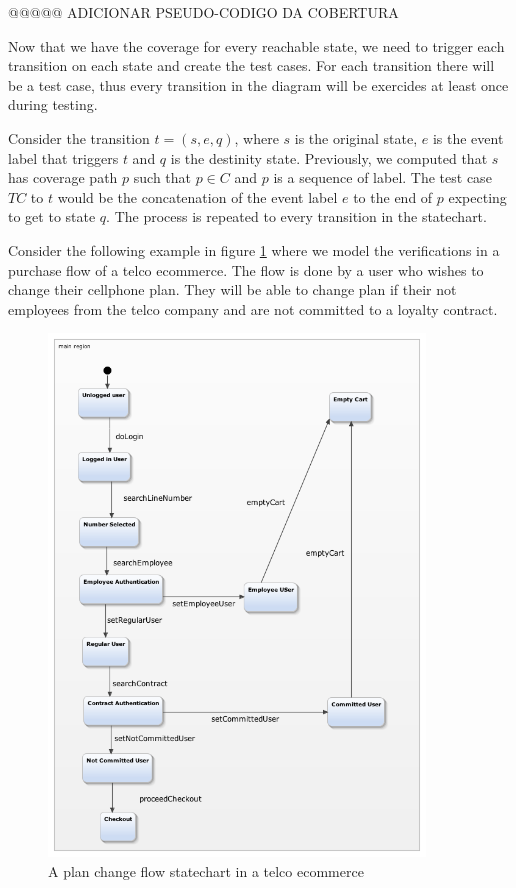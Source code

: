 @@@@@ ADICIONAR PSEUDO-CODIGO DA COBERTURA

Now that we have the coverage for every reachable state, we need to trigger each transition on each state and create the test cases. For each transition there will be a test case, thus every transition in the diagram will be exercides at least once during testing.

Consider the transition $t = (s,e,q)$, where $s$ is the original state, $e$ is the event label that triggers $t$ and $q$ is the destinity state. Previously, we computed that $s$ has coverage path $p$ such that $p \in C$ and $p$ is a sequence of label. The test case $TC$ to $t$ would be the concatenation of the event label $e$ to the end of $p$ expecting to get to state $q$. The process is repeated to every transition in the statechart.

Consider the following example in figure \ref{fig:trocaPlano} where we model the verifications in a purchase flow of a telco ecommerce. The flow is done by a user who wishes to change their cellphone plan. They will be able to change plan if their not employees from the telco company and are not committed to a loyalty contract.

\begin{figure}[htb]
\centering
\includegraphics[width=10cm]{figuras/trocaPlano}
\caption{\label{fig:trocaPlano} A plan change flow statechart in a telco ecommerce}
\end{figure}

